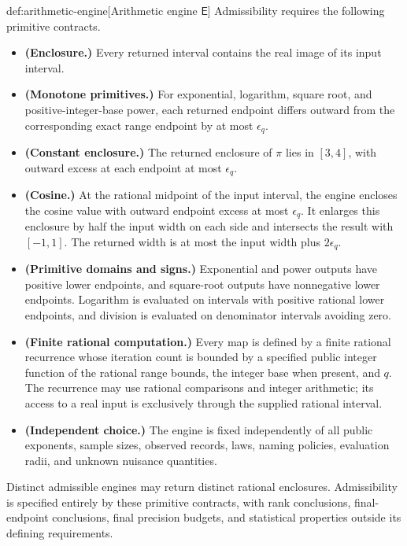 \begin{definitionv}{def:arithmetic-engine}[Arithmetic engine $\mathsf E$]
Admissibility requires the following primitive contracts.
\begin{itemize}
\item \textbf{(Enclosure.)} Every returned interval contains the real image of its input interval.
\item \textbf{(Monotone primitives.)} For exponential, logarithm, square root, and positive-integer-base power, each returned endpoint differs outward from the corresponding exact range endpoint by at most \(\epsilon_q\).
\item \textbf{(Constant enclosure.)} The returned enclosure of \(\pi\) lies in \([3,4]\), with outward excess at each endpoint at most \(\epsilon_q\).
\item \textbf{(Cosine.)} At the rational midpoint of the input interval, the engine encloses the cosine value with outward endpoint excess at most \(\epsilon_q\). It enlarges this enclosure by half the input width on each side and intersects the result with \([-1,1]\). The returned width is at most the input width plus \(2\epsilon_q\).
\item \textbf{(Primitive domains and signs.)} Exponential and power outputs have positive lower endpoints, and square-root outputs have nonnegative lower endpoints. Logarithm is evaluated on intervals with positive rational lower endpoints, and division is evaluated on denominator intervals avoiding zero.
\item \textbf{(Finite rational computation.)} Every map is defined by a finite rational recurrence whose iteration count is bounded by a specified public integer function of the rational range bounds, the integer base when present, and \(q\). The recurrence may use rational comparisons and integer arithmetic; its access to a real input is exclusively through the supplied rational interval.
\item \textbf{(Independent choice.)} The engine is fixed independently of all public exponents, sample sizes, observed records, laws, naming policies, evaluation radii, and unknown nuisance quantities.
\end{itemize}
Distinct admissible engines may return distinct rational enclosures. Admissibility is specified entirely by these primitive contracts, with rank conclusions, final-endpoint conclusions, final precision budgets, and statistical properties outside its defining requirements.
\end{definitionv}

